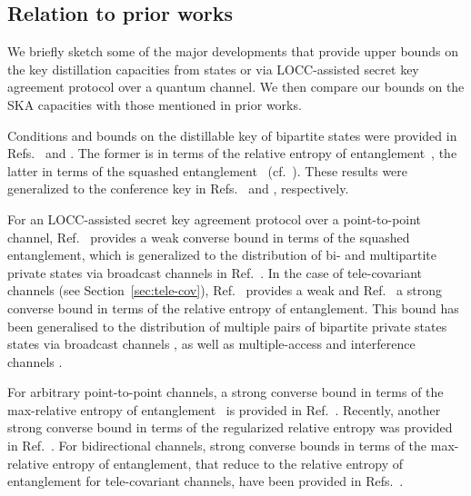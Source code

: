 \documentclass[aps,pra,twocolumn,superscriptaddress,longbibliography]{revtex4-1}
\begin{document}
\subsection{Relation to prior works}\label{sec:survey}
We briefly sketch some of the major developments that provide upper bounds on the key distillation capacities from states or via LOCC-assisted secret key agreement protocol over a quantum channel. We then compare our bounds on the SKA capacities with those mentioned in prior works. 
 
Conditions and bounds on the distillable key of bipartite states were provided in Refs.~\cite{HHHO05, HHHO09} and \cite{christandl2004squashed}. The former is in terms of the relative entropy of entanglement~\cite{VPRK97,VP98}, the latter in terms of the squashed entanglement~\cite{CW04} (cf.~\cite{Tuc99,Tuc02}). These results were generalized to the conference key in Refs.~\cite{AH09} and \cite{YHH+09}, respectively.

For an LOCC-assisted secret key agreement protocol over a point-to-point channel,  Ref.~\cite{TGW14} provides a weak converse bound in terms of the squashed entanglement, which is generalized to the distribution of bi- and multipartite private states via broadcast channels in Ref.~\cite{seshadreesan2016bounds}. In the case of tele-covariant channels (see Section~\ref{sec:tele-cov}), Ref.~\cite{PLOB15} provides a weak and Ref.~\cite{WTB16} a strong converse bound in terms of the relative entropy of entanglement. This bound has been generalised to the distribution of multiple pairs of bipartite private states states via broadcast channels \cite{LP17,TSW17}, as well as multiple-access and interference channels \cite{LP17}.





For arbitrary point-to-point channels, a strong converse bound in terms of the max-relative entropy of entanglement~\cite{Dat09} is provided in Ref.~\cite{CM17}. Recently, another strong converse bound in terms of the regularized relative entropy was provided in Ref.~\cite{FF19}. For bidirectional channels, strong converse bounds in terms of the max-relative entropy of entanglement, that reduce to the relative entropy of entanglement for tele-covariant channels, have been provided in Refs.~\cite{DBW17,BDW18,D18thesis}.   
\end{document}
